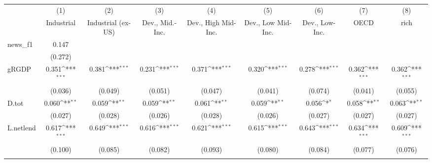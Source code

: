 {
\def\sym#1{\ifmmode^{#1}\else\(^{#1}\)\fi}
\begin{tabular}{l*{8}{c}}
\toprule
            &\multicolumn{1}{c}{(1)}&\multicolumn{1}{c}{(2)}&\multicolumn{1}{c}{(3)}&\multicolumn{1}{c}{(4)}&\multicolumn{1}{c}{(5)}&\multicolumn{1}{c}{(6)}&\multicolumn{1}{c}{(7)}&\multicolumn{1}{c}{(8)}\\
            &\multicolumn{1}{c}{Industrial}&\multicolumn{1}{c}{Industrial (ex-US)}&\multicolumn{1}{c}{Dev., Mid.-Inc.}&\multicolumn{1}{c}{Dev., High Mid-Inc.}&\multicolumn{1}{c}{Dev., Low Mid-Inc.}&\multicolumn{1}{c}{Dev., Low-Inc.}&\multicolumn{1}{c}{OECD}&\multicolumn{1}{c}{rich}\\
\midrule
news\_f1     &       0.147         &                     &                     &                     &                     &                     &                     &                     \\
            &     (0.272)         &                     &                     &                     &                     &                     &                     &                     \\
\addlinespace
gRGDP       &       0.351\sym{***}&       0.381\sym{***}&       0.231\sym{***}&       0.371\sym{***}&       0.320\sym{***}&       0.278\sym{***}&       0.362\sym{***}&       0.362\sym{***}\\
            &     (0.036)         &     (0.049)         &     (0.051)         &     (0.047)         &     (0.041)         &     (0.074)         &     (0.041)         &     (0.055)         \\
\addlinespace
D.tot       &       0.060\sym{**} &       0.059\sym{**} &       0.059\sym{**} &       0.061\sym{**} &       0.059\sym{**} &       0.056\sym{*}  &       0.058\sym{**} &       0.063\sym{**} \\
            &     (0.027)         &     (0.028)         &     (0.026)         &     (0.028)         &     (0.026)         &     (0.027)         &     (0.027)         &     (0.027)         \\
\addlinespace
L.netlend   &       0.617\sym{***}&       0.649\sym{***}&       0.616\sym{***}&       0.621\sym{***}&       0.615\sym{***}&       0.643\sym{***}&       0.634\sym{***}&       0.609\sym{***}\\
            &     (0.100)         &     (0.085)         &     (0.082)         &     (0.093)         &     (0.080)         &     (0.084)         &     (0.077)         &     (0.076)         \\
\addlinespace

\end{tabular}}
